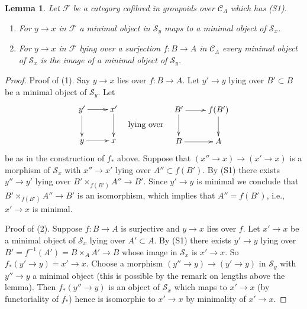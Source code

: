 \documentclass{stacks-project}
\theoremstyle{plain}
\newtheorem{lemma}[subsection]{Lemma}
\theoremstyle{definition}
\theoremstyle{remark}
\numberwithin{equation}{subsection}
\begin{document}
\begin{lemma}
\label{lemma-smallest-where-descends}
Let $\mathcal{F}$ be a category cofibred in groupoids over
$\mathcal{C}_\Lambda$ which has (S1).
\begin{enumerate}
\item For $y \to x$ in $\mathcal{F}$ a minimal
object in $\mathcal{S}_y$ maps to a minimal object of $\mathcal{S}_x$.
\item For $y \to x$ in $\mathcal{F}$ lying over a surjection
$f : B \to A$ in $\mathcal{C}_\Lambda$ every minimal object
of $\mathcal{S}_x$ is the image of a minimal object of
$\mathcal{S}_y$.
\end{enumerate}
\end{lemma}

\begin{proof}
Proof of (1). Say $y \to x$ lies over $f : B \to A$. Let $y' \to y$
lying over $B' \subset B$ be a minimal object of $\mathcal{S}_y$. Let
$$
\vcenter{
\xymatrix{
y' \ar[d] \ar[r] & x' \ar[d] \\
y \ar[r] & x
}
}
\quad\text{lying over}\quad
\vcenter{
\xymatrix{
B' \ar[d] \ar[r] & f(B') \ar[d] \\
B \ar[r] & A
}
}
$$
be as in the construction of $f_*$ above. Suppose that
$(x'' \to x) \to (x' \to x)$ is a morphism of $\mathcal{S}_x$
with $x'' \to x'$ lying over $A'' \subset f(B')$. By (S1)
there exists $y'' \to y'$ lying over $B' \times_{f(B')} A'' \to B'$.
Since $y' \to y$ is minimal we conclude that
$B' \times_{f(B')} A'' \to B'$ is an isomorphism, which implies that
$A'' = f(B')$, i.e., $x' \to x$ is minimal.

\medskip\noindent
Proof of (2). Suppose $f : B \to A$ is surjective and $y \to x$ lies over $f$.
Let $x' \to x$ be a minimal object of $\mathcal{S}_x$ lying over $A' \subset A$.
By (S1) there exists $y' \to y$ lying over
$B' = f^{-1}(A') = B \times_A A' \to B$ whose image in $\mathcal{S}_x$ is
$x' \to x$. So $f_*(y' \to y) = x' \to x$.
Choose a morphism $(y'' \to y) \to (y' \to y)$ in
$\mathcal{S}_y$ with $y'' \to y$ a minimal object (this is possible by
the remark on lengths above the lemma). Then $f_*(y'' \to y)$ is an
object of $\mathcal{S}_x$ which maps to $x' \to x$ (by functoriality of
$f_*$) hence is isomorphic to $x' \to x$ by minimality of $x' \to x$.
\end{proof}
\end{document}
